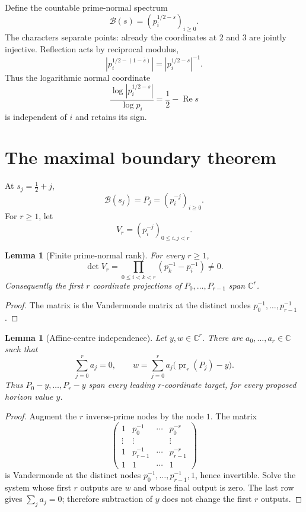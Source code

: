 \documentclass[11pt]{article}
\newtheorem{lemma}[theorem]{Lemma}
\theoremstyle{definition}
\theoremstyle{remark}
\newcommand{\C}{\mathbb C}
\newcommand{\cB}{\mathcal B}
\newcommand{\Rea}{\operatorname{Re}}
\newcommand{\pr}{\operatorname{pr}}
\begin{document}
Define the countable prime-normal spectrum
\[
                         \cB(s)=(p_i^{1/2-s})_{i\geq0}.
\tag{4.6}\label{eq:normal-spectrum}
\]
The characters separate points: already the coordinates at \(2\) and \(3\)
are jointly injective.  Reflection acts by reciprocal modulus,
\[
 |p_i^{1/2-(1-\overline{s})}|
       =|p_i^{1/2-s}|^{-1}.
\tag{4.7}\label{eq:reflection}
\]
Thus the logarithmic normal coordinate
\[
 \frac{\log|p_i^{1/2-s}|}{\log p_i}
                    =\frac12-\Rea s
\tag{4.8}\label{eq:orientation}
\]
is independent of \(i\) and retains its sign.

\section{The maximal boundary theorem}

At \(s_j=\tfrac12+j\),
\[
                    \cB(s_j)=P_j=(p_i^{-j})_{i\geq0}.
\tag{5.1}\label{eq:vandermonde-packets}
\]
For \(r\geq1\), let
\[
                   V_r=(p_i^{-j})_{0\leq i,j<r}.
\tag{5.2}\label{eq:vandermonde}
\]

\begin{lemma}[Finite prime-normal rank]\label{lem:vandermonde}
For every \(r\geq1\),
\[
 \det V_r
   =\prod_{0\leq i<k<r}(p_k^{-1}-p_i^{-1})\ne0.
\tag{5.3}\label{eq:vandermonde-det}
\]
Consequently the first \(r\) coordinate projections of
\(P_0,\ldots,P_{r-1}\) span \(\C^r\).
\end{lemma}

\begin{proof}
The matrix is the Vandermonde matrix at the distinct nodes
\(p_0^{-1},\ldots,p_{r-1}^{-1}\).
\end{proof}

\begin{lemma}[Affine-centre independence]\label{lem:affine-vandermonde}
Let \(y,w\in\C^r\).  There are
\(a_0,\ldots,a_r\in\C\) such that
\[
       \sum_{j=0}^{r}a_j=0,\qquad
       w=\sum_{j=0}^{r}a_j\bigl(\pr_r(P_j)-y\bigr).
\tag{5.4}\label{eq:affine-span}
\]
Thus \(P_0-y,\ldots,P_r-y\) span every leading \(r\)-coordinate target,
for every proposed horizon value \(y\).
\end{lemma}

\begin{proof}
Augment the \(r\) inverse-prime nodes by the node \(1\).  The matrix
\[
 \begin{pmatrix}
  1&p_0^{-1}&\cdots&p_0^{-r}\\
  \vdots&\vdots&&\vdots\\
  1&p_{r-1}^{-1}&\cdots&p_{r-1}^{-r}\\
  1&1&\cdots&1
 \end{pmatrix}
\]
is Vandermonde at the distinct nodes
\(p_0^{-1},\ldots,p_{r-1}^{-1},1\), hence invertible.  Solve the system
whose first \(r\) outputs are \(w\) and whose final output is zero.  The
last row gives \(\sum_ja_j=0\); therefore subtraction of \(y\) does not
change the first \(r\) outputs.
\end{proof}
\end{document}
